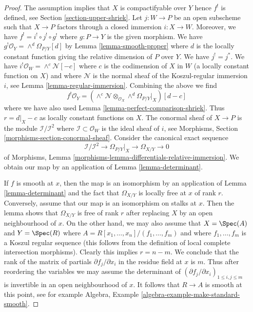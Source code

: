 \begin{proof}
The assumption implies that $X$ is compactifyable over $Y$ hence $f^!$
is defined, see Section \ref{section-upper-shriek}.
Let $j : W \to P$ be an open subscheme such that
$X \to P$ factors through a closed immersion $i : X \to W$.
Moreover, we have $f^! = i^! \circ j^! \circ g^!$ where
$g : P \to Y$ is the given morphism.
We have $g^!\mathcal{O}_Y = \wedge^d\Omega_{P/Y}[d]$ by
Lemma \ref{lemma-smooth-proper} where $d$ is the locally
constant function giving the relative dimension of $P$ over $Y$.
We have $j^! = j^*$. We have $i^!\mathcal{O}_W = \wedge^c\mathcal{N}[-c]$
where $c$ is the codimension of $X$ in $W$ (a locally constant
function on $X$) and where $\mathcal{N}$ is the normal sheaf of
the Koszul-regular immersion $i$, see Lemma \ref{lemma-regular-immersion}.
Combining the above we find
$$
f^!\mathcal{O}_Y =
\left(\wedge^c\mathcal{N} \otimes_{\mathcal{O}_X}
\wedge^d\Omega_{P/Y}|_X\right)[d - c]
$$
where we have also used Lemma \ref{lemma-perfect-comparison-shriek}.
Thus $r = d|_X - c$ as locally constant functions on $X$.
The conormal sheaf of $X \to P$ is the module
$\mathcal{I}/\mathcal{I}^2$ where $\mathcal{I} \subset \mathcal{O}_W$
is the ideal sheaf of $i$, see
Morphisms, Section \ref{morphisms-section-conormal-sheaf}.
Consider the canonical exact sequence
$$
\mathcal{I}/\mathcal{I}^2 \to
\Omega_{P/Y}|_X \to \Omega_{X/Y} \to 0
$$
of Morphisms, Lemma \ref{morphisms-lemma-differentials-relative-immersion}.
We obtain our map by an application of Lemma \ref{lemma-determinant}.

\medskip\noindent
If $f$ is smooth at $x$, then the map is an isomorphism by an application of
Lemma \ref{lemma-determinant}
and the fact that $\Omega_{X/Y}$ is locally free at $x$
of rank $r$. Conversely, assume that our map is an isomorphism on stalks
at $x$. Then the lemma shows that $\Omega_{X/Y}$ is free of rank $r$
after replacing $X$ by an open neighbourhood of $x$.
On the other hand, we may also assume that $X = \Spec(A)$ and
$Y = \Spec(R)$ where $A = R[x_1, \ldots, x_n]/(f_1, \ldots, f_m)$
and where $f_1, \ldots, f_m$ is a Koszul regular sequence
(this follows from the definition of local complete intersection morphisms).
Clearly this implies $r = n - m$. We conclude that the rank of the matrix
of partials $\partial f_j/\partial x_i$ in the residue field at $x$ is $m$.
Thus after reordering the variables we may assume
the determinant of $(\partial f_j/\partial x_i)_{1 \leq i, j \leq m}$
is invertible in an open neighbourhood of $x$. It follows
that $R \to A$ is smooth at this point, see for example
Algebra, Example \ref{algebra-example-make-standard-smooth}.
\end{proof}

